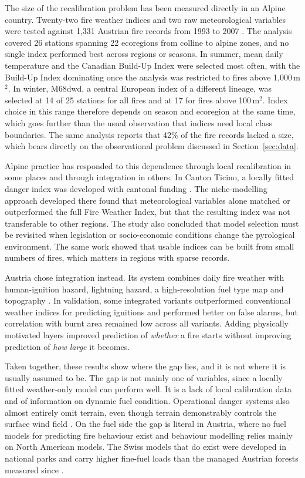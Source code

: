\documentclass[11pt,a4paper]{article}
\begin{document}
The size of the recalibration problem has been measured directly in an Alpine country. Twenty-two fire weather indices and two raw meteorological variables were tested against 1{,}331 Austrian fire records from 1993 to 2007 \citep{arpaci_selecting_2013}. The analysis covered 26 stations spanning 22 ecoregions from colline to alpine zones, and no single index performed best across regions or seasons. In summer, mean daily temperature and the Canadian Build-Up Index were selected most often, with the Build-Up Index dominating once the analysis was restricted to fires above 1{,}000\,m$^2$. In winter, M68dwd, a central European index of a different lineage, was selected at 14 of 25 stations for all fires and at 17 for fires above 100\,m$^2$. Index choice in this range therefore depends on season and ecoregion at the same time, which goes further than the usual observation that indices need local class boundaries. The same analysis reports that 42\% of the fire records lacked a size, which bears directly on the observational problem discussed in Section~\ref{sec:data}.

Alpine practice has responded to this dependence through local recalibration in some places and through integration in others. In Canton Ticino, a locally fitted danger index was developed with cantonal funding \citep{de_angelis_modelling_2015}. The niche-modelling approach developed there found that meteorological variables alone matched or outperformed the full Fire Weather Index, but that the resulting index was not transferable to other regions. The study also concluded that model selection must be revisited when legislation or socio-economic conditions change the pyrological environment. The same work showed that usable indices can be built from small numbers of fires, which matters in regions with sparse records.

Austria chose integration instead. Its system combines daily fire weather with human-ignition hazard, lightning hazard, a high-resolution fuel type map and topography \citep{muller_towards_2020}. In validation, some integrated variants outperformed conventional weather indices for predicting ignitions and performed better on false alarms, but correlation with burnt area remained low across all variants. Adding physically motivated layers improved prediction of \emph{whether} a fire starts without improving prediction of \emph{how large} it becomes.

Taken together, these results show where the gap lies, and it is not where it is usually assumed to be. The gap is not mainly one of variables, since a locally fitted weather-only model can perform well. It is a lack of local calibration data and of information on dynamic fuel condition. Operational danger systems also almost entirely omit terrain, even though terrain demonstrably controls the surface wind field \citep{ozaki_impact_2022, sharples_overview_2009}. On the fuel side the gap is literal in Austria, where no fuel models for predicting fire behaviour exist and behaviour modelling relies mainly on North American models. The Swiss models that do exist were developed in national parks and carry higher fine-fuel loads than the managed Austrian forests measured since \citep{neumann_fuel_2022}.
\end{document}
